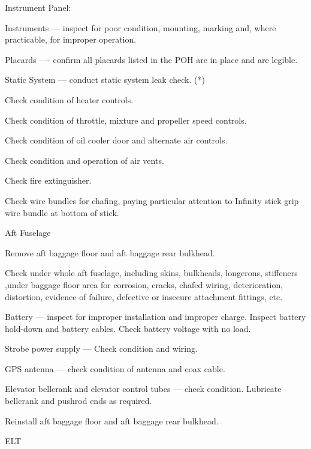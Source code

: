 \begin{enumerate*}
\begin{enumerate*}
		\item Instrument Panel:
  	\begin{enumerate*}
  		\item Instruments --- inspect for poor condition, mounting, marking and, where practicable, for improper operation.
  		\item Placards ---- confirm all placards listed in the POH are in place and are legible.
  		\item Static System --- conduct static system leak check. (*)
      \end{enumerate*}
		\item Check condition of heater controls.
		\item Check condition of throttle, mixture and propeller speed controls.
		\item Check condition of oil cooler door and alternate air controls.
		\item Check condition and operation of air vents.
		\item Check fire extinguisher.
		\item Check wire bundles for chafing, paying particular attention to Infinity stick grip wire bundle at bottom of stick.
	\end{enumerate*}
	\item{Aft Fuselage} 
	\begin{enumerate*}
		\item Remove aft baggage floor and aft baggage rear bulkhead. 
		\item Check under whole aft fuselage, including skins, bulkheads, longerons, stiffeners ,under baggage floor area for corrosion, cracks, chafed wiring, deterioration, distortion, evidence of failure, defective or insecure attachment fittings, etc.
		\item Battery --- inspect for improper installation and improper charge.  Inspect battery hold-down and battery cables.  Check battery voltage with no load.
		\item Strobe power supply --- Check condition and wiring.
		\item GPS antenna --- check condition of antenna and coax cable.
		\item Elevator bellcrank and elevator control tubes --- check condition.  Lubricate bellcrank and pushrod ends as required. 
		\item Reinstall aft baggage floor and aft baggage rear bulkhead. 
	\end{enumerate*}
	\item{ELT} 
	\begin{enumerate*}

\end{enumerate*}
\end{enumerate*}
